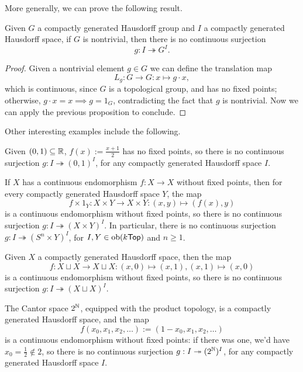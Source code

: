 More generally, we can prove the following result.

\begin{proposition}
    Given $G$ a compactly generated Hausdorff group and $I$ a compactly generated Hausdorff space, if $G$ is nontrivial, then there is no continuous surjection
    \[ g : I \twoheadrightarrow G^I. \]
\end{proposition}

\begin{proof}
    Given a nontrivial element $g \in G$ we can define the translation map
    \[ L_g : G \to G : x \mapsto g \cdot x, \]
    which is continuous, since $G$ is a topological group, and has no fixed points; otherwise, $g \cdot x = x \implies g = 1_G$, contradicting the fact that $g$ is nontrivial.
    Now we can apply the previous proposition to conclude.
\end{proof}

Other interesting examples include the following.

\begin{example}
    Given $(0,1) \subseteq \mathbb{R}$, $f(x) := \frac{x + 1}{2}$ has no fixed points, so there is no continuous surjection $g : I \twoheadrightarrow (0,1)^I$, for any compactly generated Hausdorff space $I$.
\end{example}

\begin{example}
    If $X$ has a continuous endomorphism $f : X \to X$ without fixed points, then for every compactly generated Hausdorff space $Y$, the map
    \[ f \times 1_Y : X \times Y \to X \times Y : (x,y) \mapsto (f(x),y) \]
    is a continuous endomorphism without fixed points, so there is no continuous surjection $g : I \twoheadrightarrow (X \times Y)^I$.
    In particular, there is no continuous surjection $g : I \twoheadrightarrow (S^n \times Y)^I$, for $I, Y \in \operatorname{ob}(k\mathsf{Top})$ and $n \geq 1$.
\end{example}

\begin{example}
    Given $X$ a compactly generated Hausdorff space, then the map
    \[ f : X \sqcup X \to X \sqcup X : (x,0) \mapsto (x,1), (x,1) \mapsto (x,0) \]
    is a continuous endomorphism without fixed points, so there is no continuous surjection $g : I \twoheadrightarrow (X \sqcup X)^I$.
\end{example}

\begin{example}
    The Cantor space $2^{\mathbb{N}}$, equipped with the product topology, is a compactly generated Hausdorff space, and the map
    \[ f(x_0,x_1,x_2,\dots) := (1-x_0,x_1,x_2,\dots) \]
    is a continuous endomorphism without fixed points: if there was one, we'd have $x_0 = \frac 12 \not\in 2$, so there is no continuous surjection $g : I \twoheadrightarrow (2^{\mathbb{N}})^I$, for any compactly generated Hausdorff space $I$.
\end{example}

